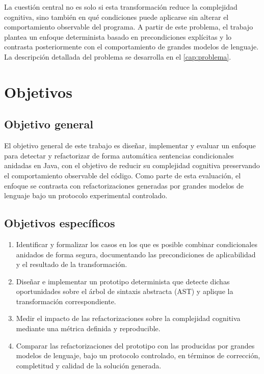 La cuestión central no es solo si esta transformación reduce la complejidad
cognitiva, sino también en qué condiciones puede aplicarse sin alterar el
comportamiento observable del programa. A partir de este problema, el trabajo
plantea un enfoque determinista basado en precondiciones explícitas y lo
contrasta posteriormente con el comportamiento de grandes modelos de lenguaje.
La descripción detallada del problema se desarrolla en el
\autoref{cap:problema}.

\section{Objetivos}
\label{sec:objetivos-intro}

\subsection*{Objetivo general}

El objetivo general de este trabajo es diseñar, implementar y evaluar un enfoque para detectar y refactorizar de
forma automática sentencias condicionales anidadas en Java, con el objetivo
de reducir su complejidad cognitiva preservando el
comportamiento observable del código. Como parte de esta evaluación, el
enfoque se contrasta con refactorizaciones generadas por grandes modelos de
lenguaje bajo un protocolo experimental controlado.

\subsection*{Objetivos específicos}

\begin{enumerate}
  \item Identificar y formalizar los casos en los que es posible combinar
  condicionales anidados de forma segura, documentando las precondiciones de
  aplicabilidad y el resultado de la transformación.

  \item Diseñar e implementar un prototipo determinista que detecte dichas
  oportunidades sobre el árbol de sintaxis abstracta (AST) y aplique la
  transformación correspondiente.

  \item Medir el impacto de las refactorizaciones sobre la complejidad
  cognitiva mediante una métrica definida y reproducible.

  \item Comparar las refactorizaciones del prototipo con las producidas por
  grandes modelos de lenguaje, bajo un protocolo controlado, en términos de
  corrección, completitud y calidad de la solución generada.
\end{enumerate}

